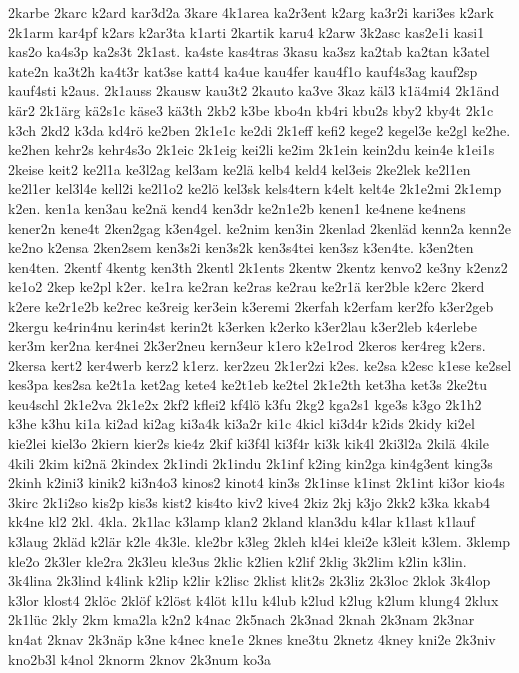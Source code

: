 {2karbe
2karc
k2ard
kar3d2a
3kare
4k1area
ka2r3ent
k2arg
ka3r2i
kari3es
k2ark
2k1arm
kar4pf
k2ars
k2ar3ta
k1arti
2kartik
karu4
k2arw
3k2asc
kas2e1i
kasi1
kas2o
ka4s3p
ka2s3t
2k1ast.
ka4ste
kas4tras
3kasu
ka3sz
ka2tab
ka2tan
k3atel
kate2n
ka3t2h
ka4t3r
kat3se
katt4
ka4ue
kau4fer
kau4f1o
kauf4s3ag
kauf2sp
kauf4sti
k2aus.
2k1auss
2kausw
kau3t2
2kauto
ka3ve
3kaz
käl3
k1ä4mi4
2k1änd
kär2
2k1ärg
kä2s1c
käse3
kä3th
2kb2
k3be
kbo4n
kb4ri
kbu2s
kby2
kby4t
2k1c
k3ch
2kd2
k3da
kd4rö
ke2ben
2k1e1c
ke2di
2k1eff
kefi2
kege2
kegel3e
ke2gl
ke2he.
ke2hen
kehr2s
kehr4s3o
2k1eic
2k1eig
kei2li
ke2im
2k1ein
kein2du
kein4e
k1ei1s
2keise
keit2
ke2l1a
ke3l2ag
kel3am
ke2lä
kelb4
keld4
kel3eis
2ke2lek
ke2l1en
ke2l1er
kel3l4e
kell2i
ke2l1o2
ke2lö
kel3sk
kels4tern
k4elt
kelt4e
2k1e2mi
2k1emp
k2en.
ken1a
ken3au
ke2nä
kend4
ken3dr
ke2n1e2b
kenen1
ke4nene
ke4nens
kener2n
kene4t
2ken2gag
k3en4gel.
ke2nim
ken3in
2kenlad
2kenläd
kenn2a
kenn2e
ke2no
k2ensa
2ken2sem
ken3s2i
ken3s2k
ken3s4tei
ken3sz
k3en4te.
k3en2ten
ken4ten.
2kentf
4kentg
ken3th
2kentl
2k1ents
2kentw
2kentz
kenvo2
ke3ny
k2enz2
ke1o2
2kep
ke2pl
k2er.
ke1ra
ke2ran
ke2ras
ke2rau
ke2r1ä
ker2ble
k2erc
2kerd
k2ere
ke2r1e2b
ke2rec
ke3reig
ker3ein
k3eremi
2kerfah
k2erfam
ker2fo
k3er2geb
2kergu
ke4rin4nu
kerin4st
kerin2t
k3erken
k2erko
k3er2lau
k3er2leb
k4erlebe
ker3m
ker2na
ker4nei
2k3er2neu
kern3eur
k1ero
k2e1rod
2keros
ker4reg
k2ers.
2kersa
kert2
ker4werb
kerz2
k1erz.
ker2zeu
2k1er2zi
k2es.
ke2sa
k2esc
k1ese
ke2sel
kes3pa
kes2sa
ke2t1a
ket2ag
kete4
ke2t1eb
ke2tel
2k1e2th
ket3ha
ket3s
2ke2tu
keu4schl
2k1e2va
2k1e2x
2kf2
kflei2
kf4lö
k3fu
2kg2
kga2s1
kge3s
k3go
2k1h2
k3he
k3hu
ki1a
ki2ad
ki2ag
ki3a4k
ki3a2r
ki1c
4kicl
ki3d4r
k2ids
2kidy
ki2el
kie2lei
kiel3o
2kiern
kier2s
kie4z
2kif
ki3f4l
ki3f4r
ki3k
kik4l
2ki3l2a
2kilä
4kile
4kili
2kim
ki2nä
2kindex
2k1indi
2k1indu
2k1inf
k2ing
kin2ga
kin4g3ent
king3s
2kinh
k2ini3
kinik2
ki3n4o3
kinos2
kinot4
kin3s
2k1inse
k1inst
2k1int
ki3or
kio4s
3kirc
2k1i2so
kis2p
kis3s
kist2
kis4to
kiv2
kive4
2kiz
2kj
k3jo
2kk2
k3ka
kkab4
kk4ne
kl2
2kl.
4kla.
2k1lac
k3lamp
klan2
2kland
klan3du
k4lar
k1last
k1lauf
k3laug
2kläd
k2lär
k2le
4k3le.
kle2br
k3leg
2kleh
kl4ei
klei2e
k3leit
k3lem.
3klemp
kle2o
2k3ler
kle2ra
2k3leu
kle3us
2klic
k2lien
k2lif
2klig
3k2lim
k2lin
k3lin.
3k4lina
2k3lind
k4link
k2lip
k2lir
k2lisc
2klist
klit2s
2k3liz
2k3loc
2klok
3k4lop
k3lor
klost4
2klöc
2klöf
k2löst
k4löt
k1lu
k4lub
k2lud
k2lug
k2lum
klung4
2klux
2k1lüc
2kly
2km
kma2la
k2n2
k4nac
2k5nach
2k3nad
2knah
2k3nam
2k3nar
kn4at
2knav
2k3näp
k3ne
k4nec
kne1e
2knes
kne3tu
2knetz
4kney
kni2e
2k3niv
kno2b3l
k4nol
2knorm
2knov
2k3num
ko3a
}
